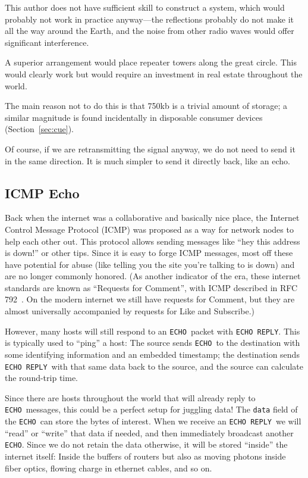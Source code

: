 \documentclass[twocolumn]{article}
\begin{document}
This author does not have sufficient skill to construct a system,
which would probably not work in practice anyway---the reflections
probably do not make it all the way around the Earth, and the noise
from other radio waves would offer significant interference.

A superior arrangement would place repeater towers along the great
circle. This would clearly work but would require an investment
in real estate throughout the world.

The main reason not to do this is that 750kb is a trivial amount
of storage; a similar magnitude is found incidentally in disposable
consumer devices (Section~\ref{sec:cue}).


Of course, if we are retransmitting the signal anyway, we do not need
to send it in the same direction. It is much simpler to send it
directly back, like an echo.

\subsection{ICMP Echo}

Back when the internet was a collaborative and basically nice place,
the Internet Control Message Protocol (ICMP) was proposed as a way for
network nodes to help each other out. This protocol allows sending
messages like ``hey this address is down!'' or other tips. Since it is
easy to forge ICMP messages, most off these have potential for abuse
(like telling you the site you're talking to is down) and are no
longer commonly honored. (As another indicator of the era, these
internet standards are known as ``Requests for Comment'', with ICMP
described in RFC 792~\cite{rfc792}. On the modern internet we still
have requests for Comment, but they are almost universally accompanied
by requests for Like and Subscribe.)

\newcommand\icmpecho{{\tt ECHO}}
\newcommand\icmpechoreply{{\tt ECHO REPLY}}

However, many hosts will still respond to an \icmpecho\ packet with
\icmpechoreply.
This is typically used to ``ping'' a host: The source sends
\icmpecho\ to the destination with some identifying information and an
embedded timestamp; the destination sends \icmpechoreply\ with that
same data back to the source, and the source can calculate the
round-trip time.

Since there are hosts throughout the world that will already reply to
\icmpecho\ messages, this could be a perfect setup for juggling data!
The {\tt data} field of the \icmpecho\ can store the bytes of interest.
When we receive an \icmpechoreply\ we will ``read'' or ``write'' that
data if needed, and then immediately broadcast another \icmpecho.
Since we do not retain the data otherwise, it will be stored
``inside'' the internet itself: Inside the buffers of routers but also
as moving photons inside fiber optics, flowing charge in ethernet
cables, and so on.
\end{document}

